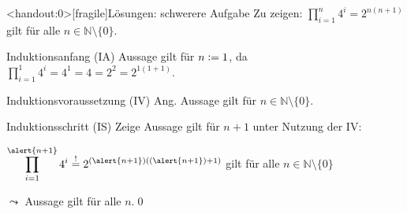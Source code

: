 {\begin{frame}<handout:0>[fragile]{Lösungen: schwerere Aufgabe}
     Zu zeigen: $\displaystyle\prod_{i=1}^{n} 4^i = 2^{n(n+1)}$ gilt für alle $n \in \mathbb{N}\setminus \{0\}$.
    \begin{alertblock}{Induktionsanfang (IA)}
        Aussage gilt für $n\vcentcolon= 1$, da $\displaystyle\prod_{i=1}^{1} 4^i = 4^1 = 4 = 2^2 = 2^{1(1+1)}$.
    \end{alertblock}
    \begin{alertblock}{Induktionsvoraussetzung (IV)}
        Ang. Aussage gilt für $n \in\mathbb{N}\setminus \{0\}$.
    \end{alertblock}
    \begin{alertblock}{Induktionsschritt (IS)}
        Zeige Aussage gilt für $n+1$ unter Nutzung der IV:\par
        $\displaystyle\prod_{i=1}^{\alert{n+1}} 4^i \overset{!}{=} 2^{(\alert{n+1})((\alert{n+1})+1)}$ gilt für alle $n \in \mathbb{N}\setminus \{0\}$
    \end{alertblock}
    \alert{$\leadsto$ Aussage gilt für alle $n$.}\qed
\end{frame}
}

